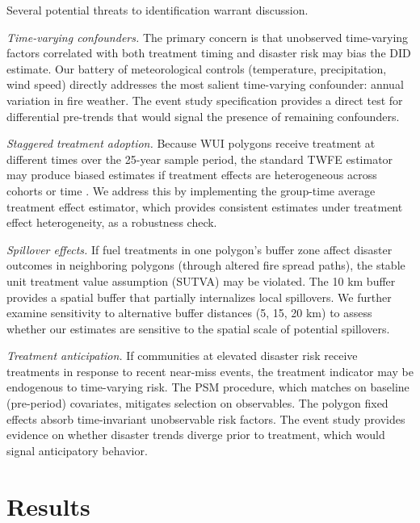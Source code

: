 \documentclass[12pt, letterpaper]{article}
\begin{document}
Several potential threats to identification warrant discussion.

\textit{Time-varying confounders.} The primary concern is that unobserved time-varying factors correlated with both treatment timing and disaster risk may bias the DID estimate. Our battery of meteorological controls (temperature, precipitation, wind speed) directly addresses the most salient time-varying confounder: annual variation in fire weather. The event study specification provides a direct test for differential pre-trends that would signal the presence of remaining confounders.

\textit{Staggered treatment adoption.} Because WUI polygons receive treatment at different times over the 25-year sample period, the standard TWFE estimator may produce biased estimates if treatment effects are heterogeneous across cohorts or time \citep{goodmanbacon2021}. We address this by implementing the \citet{callaway2021} group-time average treatment effect estimator, which provides consistent estimates under treatment effect heterogeneity, as a robustness check.

\textit{Spillover effects.} If fuel treatments in one polygon's buffer zone affect disaster outcomes in neighboring polygons (through altered fire spread paths), the stable unit treatment value assumption (SUTVA) may be violated. The 10 km buffer provides a spatial buffer that partially internalizes local spillovers. We further examine sensitivity to alternative buffer distances (5, 15, 20 km) to assess whether our estimates are sensitive to the spatial scale of potential spillovers.

\textit{Treatment anticipation.} If communities at elevated disaster risk receive treatments in response to recent near-miss events, the treatment indicator may be endogenous to time-varying risk. The PSM procedure, which matches on baseline (pre-period) covariates, mitigates selection on observables. The polygon fixed effects absorb time-invariant unobservable risk factors. The event study provides evidence on whether disaster trends diverge prior to treatment, which would signal anticipatory behavior.


\section{Results}
\end{document}
